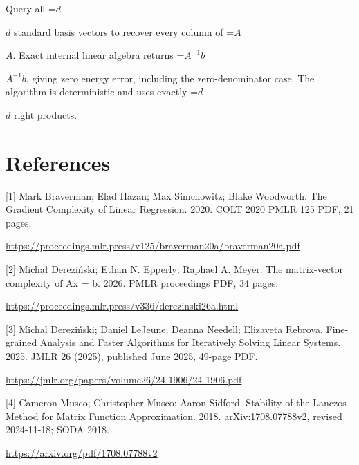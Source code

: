 \documentclass[10pt,a4paper]{article}
\newcommand{\AtlasMath}[1]{\par\begingroup\centering\setbox0=\hbox{$\displaystyle #1$}\ifdim\wd0>1.4\linewidth\typeout{ATLAS WIDE FORMULA: \the\wd0}\fi\ifdim\wd0>\linewidth\resizebox{\linewidth}{!}{\box0}\else\box0\fi\par\endgroup}
\newcommand{\AtlasInlineMath}[1]{\begingroup\setbox0=\hbox{$#1$}\ifdim\wd0>.4\linewidth\endgroup\AtlasMath{#1}\else\endgroup$#1$\fi}
\begin{document}
Query all \AtlasInlineMath{d} standard basis vectors to recover every column of \AtlasInlineMath{A}. Exact internal linear algebra returns \AtlasInlineMath{A^{-1}b}, giving zero energy error, including the zero-denominator case. The algorithm is deterministic and uses exactly \AtlasInlineMath{d} right products.

\section{References}
[1] Mark Braverman; Elad Hazan; Max Simchowitz; Blake Woodworth. The Gradient Complexity of Linear Regression. 2020. COLT 2020 PMLR 125 PDF, 21 pages.

\url{https://proceedings.mlr.press/v125/braverman20a/braverman20a.pdf}

[2] Michał Dereziński; Ethan N. Epperly; Raphael A. Meyer. The matrix-vector complexity of Ax = b. 2026. PMLR proceedings PDF, 34 pages.

\url{https://proceedings.mlr.press/v336/derezinski26a.html}

[3] Michal Dereziński; Daniel LeJeune; Deanna Needell; Elizaveta Rebrova. Fine-grained Analysis and Faster Algorithms for Iteratively Solving Linear Systems. 2025. JMLR 26 (2025), published June 2025, 49-page PDF.

\url{https://jmlr.org/papers/volume26/24-1906/24-1906.pdf}

[4] Cameron Musco; Christopher Musco; Aaron Sidford. Stability of the Lanczos Method for Matrix Function Approximation. 2018. arXiv:1708.07788v2, revised 2024-11-18; SODA 2018.

\url{https://arxiv.org/pdf/1708.07788v2}
\end{document}
